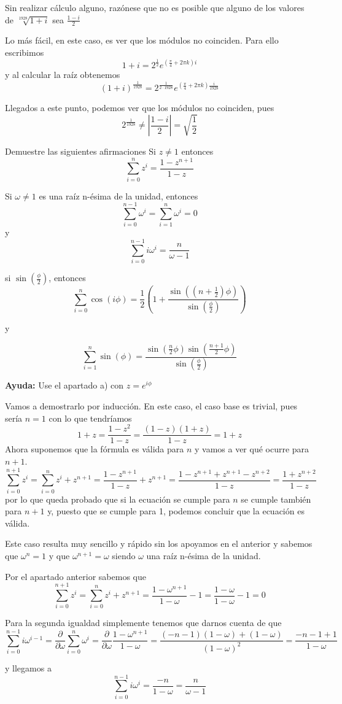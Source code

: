 \begin{problem}[8]
Sin realizar cálculo alguno, razónese que no es posible que alguno de los valores de $\sqrt[1928]{1+i}$ sea $\frac{1-i}{2}$

\solution
Lo más fácil, en este caso, es ver que los módulos no coinciden. Para ello escribimos
\[1+i = 2^{\frac{1}{2}}e^{(\frac{\pi}{4}+2\pi k)i}\]
y al calcular la raíz obtenemos
\[(1+i)^{\frac{1}{1928}} = 2^{\frac{1}{2\cdot 1928}}e^{(\frac{\pi}{4}+2\pi k)\frac{i}{1928}}\]

Llegados a este punto, podemos ver que los módulos no coinciden, pues
\[2^{\frac{1}{1928}}\neq \left|\frac{1-i}{2}\right| = \sqrt{\frac{1}{2}}\]
\end{problem}

\begin{problem}[9]
Demuestre las siguientes afirmaciones
\ppart
Si $z\neq 1$ entonces
\[\sum_{i=0}^n z^i = \frac{1-z^{n+1}}{1-z}\]

\ppart
Si $ω\neq 1$ es una raíz n-ésima de la unidad, entonces
\[\sum_{i=0}^{n-1} ω^i = \sum_{i=1}^n ω^i= 0\]
y
\[\sum_{i=0}^{n-1} i ω^i = \frac{n}{ω-1}\]

\ppart
si $\sin\left(\frac{\phi}{2}\right)$, entonces
\[\sum_{i=0}^n \cos(i\phi) = \frac{1}{2}\left(1+\frac{\sin((n+\frac{1}{2})\phi)}{\sin\left( \frac{\phi}{2}\right)}\right)\]

y

\[\sum_{i=1}^n \sin(\phi) = \frac{\sin(\frac{n}{2}\phi)\sin(\frac{n+1}{2}\phi)}{\sin(\frac{\phi}{2})}\]

\textbf{Ayuda:} Use el apartado a) con $z=e^{i\phi}$

\solution
\spart
Vamos a demostrarlo por inducción. En este caso, el caso base es trivial, pues sería $n=1$ con lo que tendríamos
\[1+z=\frac{1-z^2}{1-z}=\frac{(1-z)(1+z)}{1-z} = 1+z\]
Ahora suponemos que la fórmula es válida para $n$ y vamos a ver qué ocurre para $n+1$.
\[\sum_{i=0}^{n+1} z^i = \sum_{i=0}^n z^i + z^{n+1} = \frac{1-z^{n+1}}{1-z} + z^{n+1} = \frac{1-z^{n+1}+z^{n+1}-z^{n+2}}{1-z} = \frac{1+z^{n+2}}{1-z}\]
por lo que queda probado que si la ecuación se cumple para $n$ se cumple también para $n+1$ y, puesto que se cumple para 1, podemos concluir que la ecuación es válida.

\spart
Este caso resulta muy sencillo y rápido sin los apoyamos en el anterior y sabemos que $ω^n=1$ y que $ω^{n+1}=ω$ siendo $ω$ una raíz n-ésima de la unidad.

Por el apartado anterior sabemos que
\[\sum_{i=0}^{n+1} z^i = \sum_{i=0}^n z^i + z^{n+1} = \frac{1-ω^{n+1}}{1-ω}-1 = \frac{1-ω}{1-ω}-1 = 0\]

Para la segunda igualdad simplemente tenemos que darnos cuenta de que
\[\sum_{i=0}^{n-1} i ω^{i-1}  = \frac{\partial}{\partial ω} \sum_{i=0}^{n}ω^i = \frac{\partial}{\partial ω} \frac{1-ω^{n+1}}{1-ω} = \frac{(-n-1)(1-ω)+(1-ω)}{(1-ω)^2} = \frac{-n-1+1}{1-ω}\]

y llegamos a
\[\sum_{i=0}^{n-1} i ω^i = \frac{-n}{1-ω}=\frac{n}{ω-1}\]
\spart


\end{problem}

